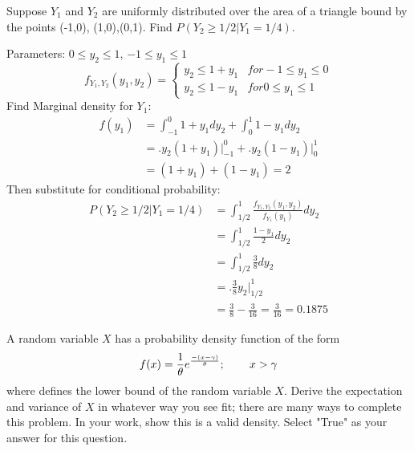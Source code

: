 \documentclass[answers]{exam}
\begin{document}
\begin{questions}
\question 
Suppose $Y_1$ and $Y_2$ are uniformly distributed over the area of a triangle bound by the points {(-1,0), (1,0),(0,1)}. Find $P(Y_2\geq1/2|Y_1=1/4)$.
\begin{solution}
	Parameters: $0\leq y_2\leq1$, $-1\leq y_1\leq1$ 
	\[f_{Y_1,Y_2}(y_1,y_2) = \begin{cases}
		y_2\leq 1+y_1 & for -1\leq y_1\leq0 \\
		y_2\leq 1-y_1 & for 0\leq y_1\leq1 
	\end{cases}\]
	Find Marginal density for $Y_1$:
	\begin{align*}
		f(y_1)
		&= \int_{-1}^{0} 1+y_1 dy_2 + \int_{0}^{1} 1-y_1 dy_2 \\
		&= \bigg. y_2(1+y_1) \bigg|_{-1}^{0} + \bigg. y_2(1-y_1) \bigg|_{0}^{1} \\
		&= (1+y_1) + (1-y_1) = 2
	\end{align*}
	Then substitute for conditional probability:
	\begin{align*}
		P(Y_2\geq1/2|Y_1=1/4)
		&= \int_{1/2}^{1}\frac{f_{Y_1,Y_2}(y_1,y_2)}{f_{Y_1}(y_1)} dy_2 \\
		&= \int_{1/2}^{1}\frac{1-y_1}{2} dy_2 \\
		&= \int_{1/2}^{1}\frac{3}{8} dy_2 \\
		&= \bigg. \frac{3}{8}y_2 \bigg|_{1/2}^{1} \\
		&= \frac{3}{8} - \frac{3}{16} = \frac{3}{16} = 0.1875
	\end{align*}
\end{solution}

\question 
A random variable $X$ has a probability density function of the form
\[ f(x) = \frac{1}{\theta} e^{\frac{-(x-\gamma)}{\theta}};\hspace{5ex} x>\gamma\]
where defines the lower bound of the random variable $X$. Derive the expectation and variance of $X$ in whatever way you see fit; there are many ways to complete this problem. In your work, show this is a valid density. Select "True" as your answer for this question.
\begin{solution}
	
\end{solution}
	
\question 

\begin{solution}
	
\end{solution}

\end{questions}
\end{document}
